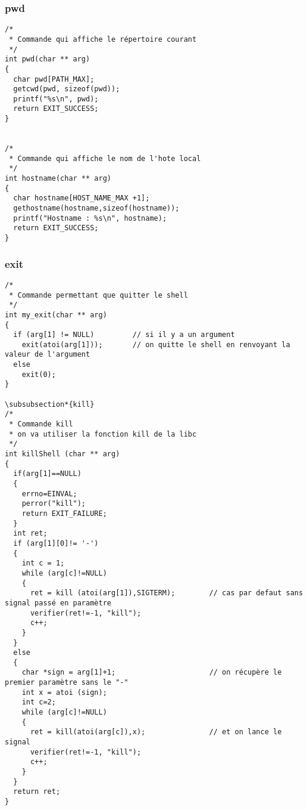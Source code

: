 \documentclass[12pt]{article}
\begin{document}
\subsubsection*{pwd}
\label{pwd et hostname}
\begin{verbatim}
/* 
 * Commande qui affiche le répertoire courant
 */
int pwd(char ** arg) 
{
  char pwd[PATH_MAX];
  getcwd(pwd, sizeof(pwd));
  printf("%s\n", pwd);
  return EXIT_SUCCESS;
}


/*
 * Commande qui affiche le nom de l'hote local
 */
int hostname(char ** arg) 
{
  char hostname[HOST_NAME_MAX +1];
  gethostname(hostname,sizeof(hostname));
  printf("Hostname : %s\n", hostname);
  return EXIT_SUCCESS;
}

\end{verbatim}
\subsubsection*{exit}
\label{exit et kill}
\begin{verbatim}
/*
 * Commande permettant que quitter le shell
 */
int my_exit(char ** arg) 
{
  if (arg[1] != NULL)         // si il y a un argument
    exit(atoi(arg[1]));       // on quitte le shell en renvoyant la valeur de l'argument
  else
    exit(0);
}

\subsubsection*{kill}
/*
 * Commande kill
 * on va utiliser la fonction kill de la libc
 */
int killShell (char ** arg)
{
  if(arg[1]==NULL)
  {
    errno=EINVAL;
    perror("kill");
    return EXIT_FAILURE;
  }
  int ret;
  if (arg[1][0]!= '-')
  {
    int c = 1;
    while (arg[c]!=NULL)
    {
      ret = kill (atoi(arg[1]),SIGTERM);        // cas par defaut sans signal passé en paramètre
      verifier(ret!=-1, "kill");
      c++;
    }
  }
  else
  {
    char *sign = arg[1]+1;                      // on récupère le premier paramètre sans le "-"
    int x = atoi (sign);
    int c=2;
    while (arg[c]!=NULL)
    {
      ret = kill(atoi(arg[c]),x);               // et on lance le signal
      verifier(ret!=-1, "kill");
      c++;
    }
  }
  return ret;
}

\end{verbatim}
\end{document}

